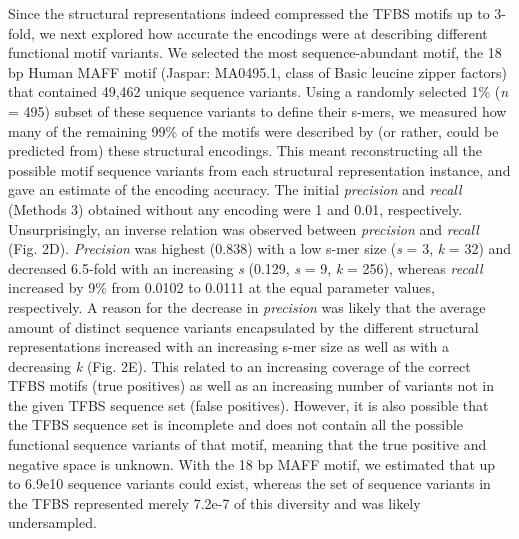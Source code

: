 \documentclass[sigconf]{acmart}
\begin{document}
Since the structural representations indeed compressed the TFBS motifs up to 3-fold, we next explored how accurate the encodings were at describing different functional motif variants. We selected the most sequence-abundant motif, the 18 bp Human MAFF motif (Jaspar: MA0495.1, class of Basic leucine zipper factors) that contained 49,462 unique sequence variants. Using a randomly selected 1\% (\textit{n} = 495) subset of these sequence variants to define their s-mers, we measured how many of the remaining 99\% of the motifs were described by (or rather, could be predicted from) these structural encodings. This meant reconstructing all the possible motif sequence variants from each structural representation instance, and gave an estimate of the encoding accuracy. The initial \textit{precision} and \textit{recall} (Methods 3) obtained without any encoding were 1 and 0.01, respectively. Unsurprisingly, an inverse relation was observed between \textit{precision} and \textit{recall} (Fig. 2D). \textit{Precision} was highest (0.838) with a low s-mer size (\textit{s} = 3, \textit{k} = 32) and decreased 6.5-fold with an increasing \textit{s} (0.129, \textit{s} = 9, \textit{k} = 256), whereas \textit{recall} increased by 9\% from 0.0102 to 0.0111 at the equal parameter values, respectively. A reason for the decrease in \textit{precision} was likely that the average amount of distinct sequence variants encapsulated by the different structural representations increased with an increasing s-mer size as well as with a decreasing \textit{k} (Fig. 2E). This related to an increasing coverage of the correct TFBS motifs (true positives) as well as an increasing number of variants not in the given TFBS sequence set (false positives). However, it is also possible that the TFBS sequence set is incomplete and does not contain all the possible functional sequence variants of that motif, meaning that the true positive and negative space is unknown. With the 18 bp MAFF motif, we estimated that up to 6.9e10 sequence variants could exist, whereas the set of sequence variants in the TFBS represented merely 7.2e-7 of this diversity and was likely undersampled.
\end{document}
